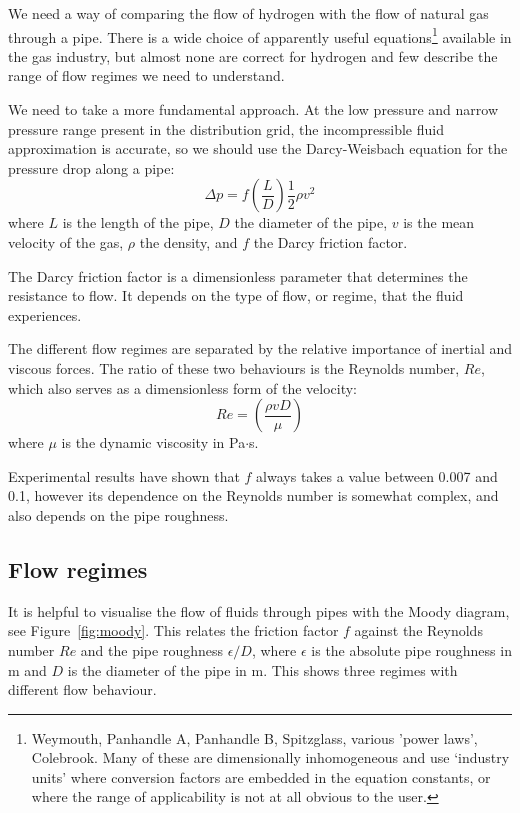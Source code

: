 \documentclass[5p]{elsarticle} %
\begin{document}
We need a way of comparing the flow of hydrogen with the flow of natural gas through a pipe. 
There is a wide choice of apparently useful equations\footnote{
Weymouth, Panhandle A, Panhandle B, Spitzglass, various 'power laws', Colebrook\citep{Allen2007, She2012}. Many of these are dimensionally inhomogeneous and use `industry units' where conversion factors are embedded in the equation constants, or where the range of applicability is not at all obvious to the user.
}
available in the gas industry, but almost none are correct for hydrogen and few describe the range of flow regimes we need to understand.

We need to take a more fundamental approach.
At the low pressure and narrow pressure range present in the distribution grid, the incompressible fluid approximation is accurate\citep{Perry2008}, so we should use the
Darcy-Weisbach equation for the pressure drop along a pipe:
\begin{equation}
\label{eqn:darcywiesbach}
\Delta p = f \left( \frac{L}{D} \right) \frac{1}{2} \rho v^2
\end{equation}
where $L$ is the length of the pipe,  $D$ the diameter of the pipe,  $v$ is the mean velocity of the gas, $\rho$ the density, and $f$ the Darcy friction factor.

The Darcy friction factor is a dimensionless parameter that determines the resistance to flow. 
It depends on the type of flow, or regime, that the fluid experiences.

The different flow regimes are separated by the relative importance of inertial and viscous forces.
The ratio of these two behaviours is the Reynolds number, $Re$, which also serves as a dimensionless form of the velocity:
\begin{equation}
\label{eqn:re}
Re =  \left ( \frac{\rho v D}{\mu}\right )
\end{equation}
where $\mu$ is the dynamic viscosity in Pa$\cdot$s.

Experimental results have shown that $f$ always takes a value between 0.007 and 0.1, however its dependence on the Reynolds number is somewhat complex\citep{Allen2007}, and also depends on the pipe roughness.

\subsection{Flow regimes}

It is helpful to visualise the flow of fluids through pipes with the Moody diagram, see Figure~\ref{fig:moody}. 
This relates the friction factor $f$ against the Reynolds number $Re$ and the pipe roughness $\epsilon/D$, where $\epsilon$ is the absolute pipe roughness in m and $D$ is the diameter of the pipe in m. 
This shows three regimes with different flow behaviour.
\end{document}
